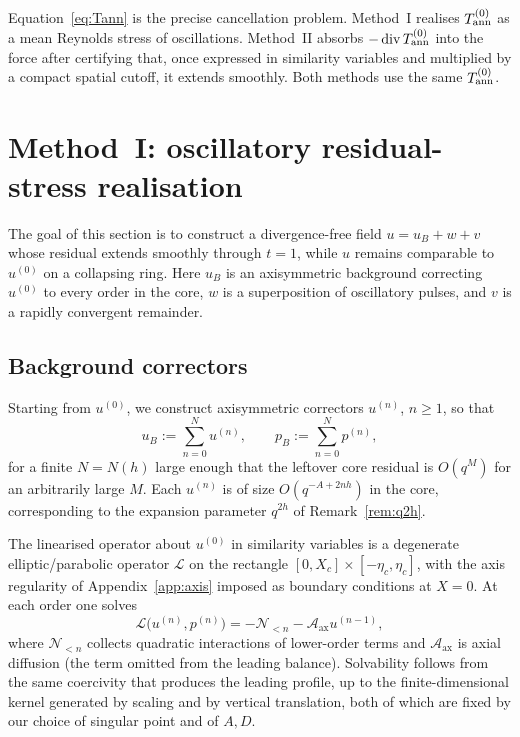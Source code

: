 Equation~\eqref{eq:Tann} is the precise cancellation problem. Method~I realises $T^{(0)}_{\mathrm{ann}}$ as a mean {R}eynolds stress of oscillations. Method~II absorbs $-\operatorname{div} T^{(0)}_{\mathrm{ann}}$ into the force after certifying that, once expressed in similarity variables and multiplied by a compact spatial cutoff, it extends smoothly. Both methods use the same $T^{(0)}_{\mathrm{ann}}$.

\section{Method~I: oscillatory residual-stress realisation}
\label{sec:methodI}

The goal of this section is to construct a divergence-free field $u=u_B+w+v$ whose residual extends smoothly through $t=1$, while $u$ remains comparable to $u^{(0)}$ on a collapsing ring. Here $u_B$ is an axisymmetric background correcting $u^{(0)}$ to every order in the core, $w$ is a superposition of oscillatory pulses, and $v$ is a rapidly convergent remainder.

\subsection{Background correctors}
\label{sec:background}

\begin{construction}
\label{con:background}
Starting from $u^{(0)}$, we construct axisymmetric correctors $u^{(n)}$, $n\ge 1$, so that
\[
u_B:=\sum_{n=0}^N u^{(n)},
\qquad
p_B:=\sum_{n=0}^N p^{(n)},
\]
for a finite $N=N(h)$ large enough that the leftover core residual is $O(q^{M})$ for an arbitrarily large $M$. Each $u^{(n)}$ is of size $O(q^{-A+2nh})$ in the core, corresponding to the expansion parameter $q^{2h}$ of Remark~\ref{rem:q2h}.
\end{construction}

The linearised operator about $u^{(0)}$ in similarity variables is a degenerate elliptic/parabolic operator $\mathcal L$ on the rectangle $[0,X_c]\times[-\eta_c,\eta_c]$, with the axis regularity of Appendix~\ref{app:axis} imposed as boundary conditions at $X=0$. At each order one solves
\[
\mathcal L\bigl(u^{(n)},p^{(n)}\bigr)
= -\mathcal N_{<n}-\mathcal A_{\mathrm{ax}}u^{(n-1)},
\]
where $\mathcal N_{<n}$ collects quadratic interactions of lower-order terms and $\mathcal A_{\mathrm{ax}}$ is axial diffusion (the term omitted from the leading balance). Solvability follows from the same coercivity that produces the leading profile, up to the finite-dimensional kernel generated by scaling and by vertical translation, both of which are fixed by our choice of singular point and of $A,D$.

